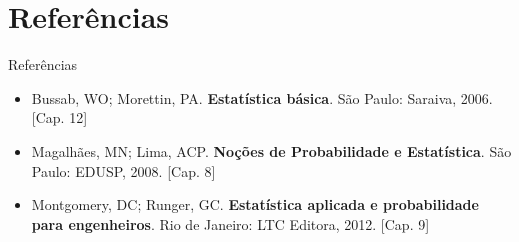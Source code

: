 \documentclass[10pt]{beamer}\usepackage[]{graphicx}\usepackage[]{color}
\theoremstyle{definition}
\begin{document}
\section{Referências}

\begin{frame}{Referências}
  \begin{itemize}
  \item Bussab, WO; Morettin, PA. \textbf{Estatística básica}. São
    Paulo: Saraiva, 2006. [Cap. 12]
  \item Magalhães, MN; Lima, ACP. \textbf{Noções de Probabilidade e
      Estatística}. São Paulo: EDUSP, 2008. [Cap. 8]
  \item Montgomery, DC; Runger, GC. \textbf{Estatística aplicada e
      probabilidade para engenheiros}. Rio de Janeiro: LTC Editora,
    2012. [Cap. 9]
  \end{itemize}
\end{frame}
\end{document}
